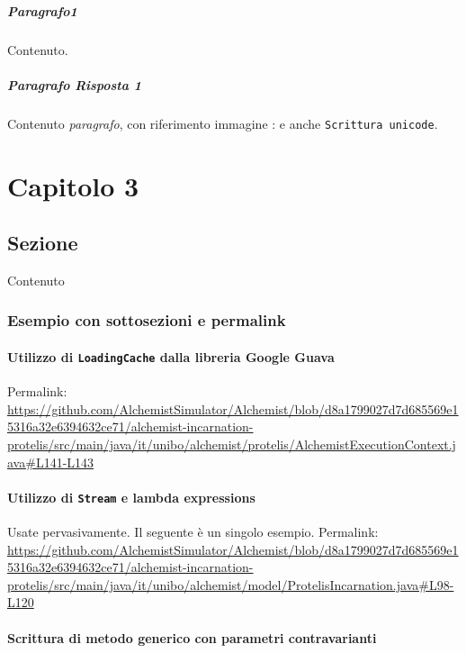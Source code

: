 \documentclass[a4paper,12pt]{report}
\begin{document}
\paragraph{Paragrafo1} Contenuto.

\paragraph{Paragrafo Risposta 1} Contenuto \textit{paragrafo}, con riferimento immagine
: e anche \texttt{Scrittura unicode}.

\chapter{Capitolo 3}
\section{Sezione}

Contenuto

\subsection{Esempio con sottosezioni e permalink}

\subsubsection{Utilizzo di \texttt{LoadingCache} dalla libreria Google Guava}

Permalink: \url{https://github.com/AlchemistSimulator/Alchemist/blob/d8a1799027d7d685569e15316a32e6394632ce71/alchemist-incarnation-protelis/src/main/java/it/unibo/alchemist/protelis/AlchemistExecutionContext.java#L141-L143}

\subsubsection{Utilizzo di \texttt{Stream} e lambda expressions}

Usate pervasivamente. Il seguente è un singolo esempio.
Permalink: \url{https://github.com/AlchemistSimulator/Alchemist/blob/d8a1799027d7d685569e15316a32e6394632ce71/alchemist-incarnation-protelis/src/main/java/it/unibo/alchemist/model/ProtelisIncarnation.java#L98-L120}

\subsubsection{Scrittura di metodo generico con parametri contravarianti}
\end{document}
